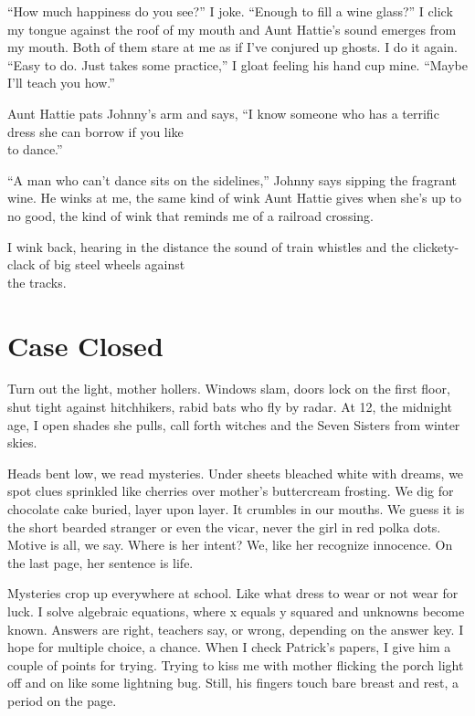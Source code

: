 \documentclass[twoside,10pt]{book}
\begin{document}
``How much happiness do you see?'' I joke. ``Enough to fill a wine
glass?'' I click my tongue against the roof of my mouth and Aunt
Hattie's sound emerges from my mouth. Both of them stare at me as if
I've conjured up ghosts. I do it again. ``Easy to do. Just takes some
practice,'' I gloat feeling his hand cup mine. ``Maybe I'll teach you
how.''

Aunt Hattie pats Johnny's arm and says, ``I know someone who has a
terrific dress she can bor­row if you like\\
to dance.''

``A man who can't dance sits on the sidelines,'' Johnny says sipping the
fragrant wine. He winks at me, the same kind of wink Aunt Hattie gives
when she's up to no good, the kind of wink that reminds me of a railroad
crossing.

I wink back, hearing in the distance the sound of train whistles and the
clickety-clack of big steel wheels against\\
the tracks.


\cleardoublepage
\chapter{Case Closed}

Turn out the light, mother hollers. Windows slam, doors lock on the
first floor, shut tight against hitchhikers, rabid bats who fly by
radar. At 12, the midnight age, I open shades she pulls, call forth
witches and the Seven Sisters from winter skies.

Heads bent low, we read mysteries. Under sheets bleached white with
dreams, we spot clues sprinkled like cherries over mother's buttercream
frosting. We dig for chocolate cake buried, layer upon layer. It
crumbles in our mouths. We guess it is the short bearded stranger or
even the vicar, never the girl in red polka dots. Motive is all, we say.
Where is her intent? We, like her recognize innocence. On the last page,
her sentence is life.

Mysteries crop up everywhere at school. Like what dress to wear or not
wear for luck. I solve algebraic equations, where x equals y squared and
unknowns become known. Answers are right, teachers say, or wrong,
depending on the answer key. I hope for multiple choice, a chance. When
I check Patrick's papers, I give him a couple of points for trying.
Trying to kiss me with mother flicking the porch light off and on like
some lightning bug. Still, his fingers touch bare breast and rest, a
period on the page.
\end{document}
